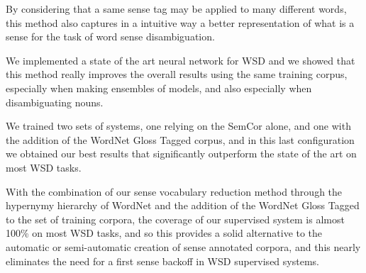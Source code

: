 \documentclass[11pt,a4paper]{article}
\begin{document}
By considering that a same sense tag may be applied to many different words, this method also captures in a intuitive way a better representation of what is a sense for the task of word sense disambiguation.

We implemented a state of the art neural network for WSD and we showed that this method really improves the overall results using the same training corpus, especially when making ensembles of models, and also especially when disambiguating nouns. 

We trained two sets of systems, one relying on the SemCor alone, and one with the addition of the WordNet Gloss Tagged corpus, and in this last configuration we obtained our best results that significantly outperform the state of the art on most WSD tasks.

With the combination of our sense vocabulary reduction method through the hypernymy hierarchy of WordNet and the addition of the WordNet Gloss Tagged to the set of training corpora, the coverage of our supervised system is almost 100\% on most WSD tasks, and so this provides a solid alternative to the automatic or semi-automatic creation of sense annotated corpora, and this nearly eliminates the need for a first sense backoff in WSD supervised systems. 

\clearpage




\end{document}
